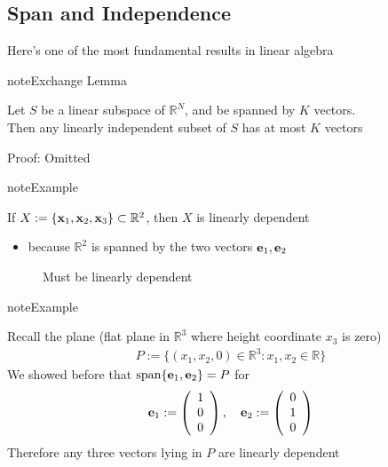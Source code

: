 \documentclass[letterpaper,10pt,english]{jupyterBook}
\begin{document}
\subsection{Span and Independence}
\label{\detokenize{05.linear_algebra:span-and-independence}}
\sphinxAtStartPar
Here’s one of the most fundamental results in linear algebra

\begin{sphinxadmonition}{note}{Exchange Lemma}

\sphinxAtStartPar
Let \(S\) be a linear subspace of \(\mathbb{R}^N\), and be spanned by \(K\) vectors. \\
Then any linearly independent subset of \(S\) has at most \(K\)
vectors
\end{sphinxadmonition}

\sphinxAtStartPar
Proof: Omitted

\begin{sphinxadmonition}{note}{Example}

\sphinxAtStartPar
If \(X := \{{\bf x}_1, {\bf x}_2, {\bf x}_3\} \subset \mathbb{R}^2\),
then \(X\) is linearly dependent
\begin{itemize}
\item {} 
\sphinxAtStartPar
because \(\mathbb{R}^2\) is spanned by the two vectors \({\bf e}_1, {\bf e}_2\)

\end{itemize}
\end{sphinxadmonition}

\begin{figure}[htbp]
\centering
\capstart

\noindent{}
\caption{Must be linearly dependent}\label{\detokenize{05.linear_algebra:id8}}\end{figure}

\begin{sphinxadmonition}{note}{Example}

\sphinxAtStartPar
Recall the plane (flat plane in \(\mathbb{R}^3\) where height coordinate \(x_3\) is zero)
\begin{equation*}
\begin{split}
P := \{ (x_1, x_2, 0) \in \mathbb{R}^3 \colon x_1, x_2 \in \mathbb{R \}}
\end{split}
\end{equation*}
\sphinxAtStartPar
We showed before that \(\mathrm{span}\{{\bf e}_1, {\bf e}_2\} = P\) for
\begin{equation*}
\begin{split}
%
{\bf e}_1 := 
\left(
\begin{array}{c}
1 \\
0 \\
0
\end{array}
\right),
\quad 
{\bf e}_2 := 
\left(
\begin{array}{c}
0 \\
1 \\
0
\end{array}
\right)
%
\end{split}
\end{equation*}
\sphinxAtStartPar
Therefore any three vectors lying in \(P\) are linearly dependent
\end{sphinxadmonition}
\end{document}
